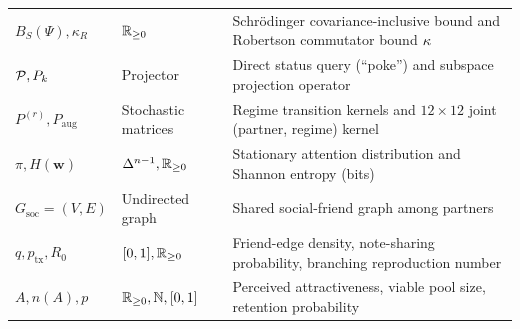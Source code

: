\begin{table}[htbp]
\begin{tabularx}{\textwidth}{@{}llX@{}}
$B_S(\Psi), \kappa_R$ & $\mathbb{R}_{\ge 0}$ & Schr\"odinger covariance-inclusive bound and Robertson commutator bound $\kappa$ \\
$\mathcal{P}, P_k$ & Projector & Direct status query (``poke'') and subspace projection operator \\
$P^{(r)}, P_{\mathrm{aug}}$ & Stochastic matrices & Regime transition kernels and $12\times 12$ joint (partner, regime) kernel \\
$\pi, H(\mathbf{w})$ & $\Delta^{n-1}, \mathbb{R}_{\ge 0}$ & Stationary attention distribution and Shannon entropy (bits) \\
$G_{\mathrm{soc}} = (V, E)$ & Undirected graph & Shared social-friend graph among partners \\
$q, p_{\mathrm{tx}}, R_0$ & $[0, 1], \mathbb{R}_{\ge 0}$ & Friend-edge density, note-sharing probability, branching reproduction number \\
$A, n(A), p$ & $\mathbb{R}_{\ge 0}, \mathbb{N}, [0, 1]$ & Perceived attractiveness, viable pool size, retention probability \\
\bottomrule
\end{tabularx}
\end{table}

\clearpage
{}

